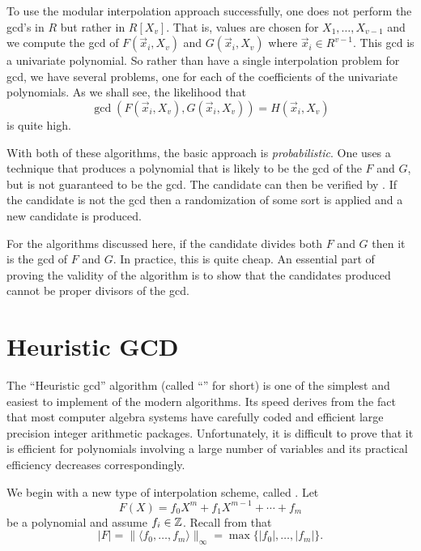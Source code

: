 To use the modular interpolation approach successfully, one
does not perform the {\sc gcd}'s in $R$ but rather in $R[X_v]$.  That is,
values are chosen for $X_1, \ldots, X_{v-1}$ and we compute the {\sc gcd} of
$F(\vec{x}_i, X_v)$ and $G(\vec{x}_i, X_v)$ where $\vec{x}_i \in
R^{v-1}$.  This {\sc gcd} is a univariate polynomial.  So rather than have a
single interpolation problem for {\sc gcd}, we have several problems, one
for each of the coefficients of the univariate polynomials.  As we
shall see, the likelihood that
\[
\gcd(F(\vec{x}_i, X_v), G(\vec{x}_i, X_v)) = H(\vec{x}_i, X_v)
\]
is quite high.

With both of these algorithms, the basic approach is {\em
probabilistic\/}.  One uses a technique that produces a polynomial
that is likely to be the {\sc gcd} of the $F$ and $G$, but is not
guaranteed to be the {\sc gcd}.  The candidate can then be verified by
.  If the candidate is not the {\sc gcd} then a
randomization of some sort is applied and a new candidate is produced.

For the algorithms discussed here, if the candidate divides both $F$
and $G$ then it is the {\sc gcd} of $F$ and $G$.  In practice, this
 is quite cheap.  An essential part of proving the
validity of the algorithm is to show that the candidates produced
cannot be proper divisors of the {\sc gcd}.

\section{Heuristic GCD}
\label{PGCD:Heuristic:Sec}

The ``Heuristic {\sc gcd}'' algorithm (called ``'' for short) is
one of the simplest and easiest to implement of the modern algorithms.
Its speed derives from the fact that most computer algebra systems
have carefully coded and efficient large precision integer arithmetic
packages.  Unfortunately, it is difficult to prove that it is
efficient for polynomials involving a large number of variables and
its practical efficiency decreases correspondingly.

We begin with a new type of interpolation scheme, called .  Let 
\[
F(X) = f_0 X^m + f_1 X^{m-1} + \cdots + f_m
\]
be a polynomial and assume $f_i \in \mathbb{Z}$.  Recall from
 that
\[
|F| = \| \langle f_0, \ldots, f_m \rangle \|_{\infty} 
  = \max \{ |f_0|, \ldots, |f_m| \}.
\]

